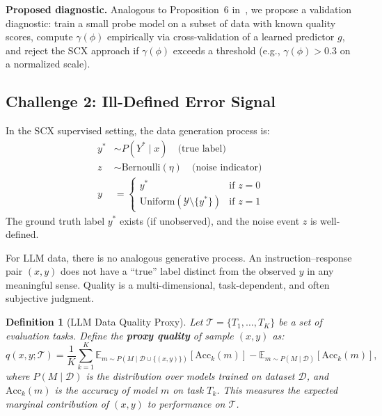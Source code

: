 \documentclass[11pt]{article}
\newtheorem{definition}{Definition}[section]
\newcommand{\cY}{\mathcal{Y}}
\newcommand{\cT}{\mathcal{T}}
\begin{document}
\textbf{Proposed diagnostic.} Analogous to Proposition~6 in~\cite{scx2026}, we propose a validation diagnostic: train a small probe model on a subset of data with known quality scores, compute $\gamma(\phi)$ empirically via cross-validation of a learned predictor $g$, and reject the SCX approach if $\gamma(\phi)$ exceeds a threshold (e.g., $\gamma(\phi) > 0.3$ on a normalized scale).

\subsection{Challenge 2: Ill-Defined Error Signal}

In the SCX supervised setting, the data generation process is:
\begin{align}
y^* &\sim P(Y^* \mid x) \quad \text{(true label)} \\
z &\sim \text{Bernoulli}(\eta) \quad \text{(noise indicator)} \\
y &= \begin{cases}
y^* & \text{if } z = 0 \\
\text{Uniform}(\cY \setminus \{y^*\}) & \text{if } z = 1
\end{cases}
\label{eq:supervised_dgp}
\end{align}
The ground truth label $y^*$ exists (if unobserved), and the noise event $z$ is well-defined.

For LLM data, there is no analogous generative process. An instruction--response pair $(x, y)$ does not have a ``true'' label distinct from the observed $y$ in any meaningful sense. Quality is a multi-dimensional, task-dependent, and often subjective judgment.

\begin{definition}[LLM Data Quality Proxy]
Let $\cT = \{T_1, \dots, T_K\}$ be a set of evaluation tasks. Define the \textbf{proxy quality} of sample $(x, y)$ as:
\begin{equation}
q(x, y; \cT) = \frac{1}{K} \sum_{k=1}^K \mathbb{E}_{m \sim P(M \mid \mathcal{D} \cup \{(x,y)\})} [\text{Acc}_k(m)] - \mathbb{E}_{m \sim P(M \mid \mathcal{D})} [\text{Acc}_k(m)],
\label{eq:proxy_quality}
\end{equation}
where $P(M \mid \mathcal{D})$ is the distribution over models trained on dataset $\mathcal{D}$, and $\text{Acc}_k(m)$ is the accuracy of model $m$ on task $T_k$. This measures the expected marginal contribution of $(x,y)$ to performance on $\cT$.
\end{definition}
\end{document}
